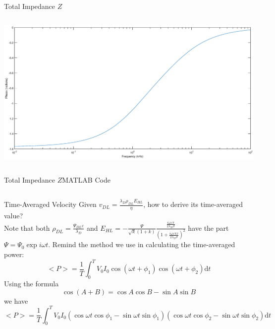 \documentclass[11pt]{beamer}
\begin{document}
\begin{frame}{Total Impedance $Z$}
\begin{columns}[onlytextwidth]
\begin{column}{0.6\textwidth}
            \includegraphics[width=\columnwidth]{4.eps}
        \end{column}
    \end{columns}
\end{frame}
\begin{frame}[fragile]{Total Impedance $Z$}{MATLAB Code}
    \inputminted[frame=single,bgcolor=bg,breaklines,breakanywhere,fontsize=\tiny]{matlab}{../Model/impedance.m}
\end{frame}
\begin{frame}{Time-Averaged Velocity}
    Given $v_{DL}=\frac{\lambda_D\rho_{DL}E_{HL}}{\eta}$, how to derive its time-averaged value?\\
    Note that both $\rho_{DL}=\frac{\Psi_{DL}\varepsilon}{\lambda_D}$ and $E_{HL}=-\frac{\Psi}{\sqrt{k}(1+k)}\frac{\frac{i\omega\varepsilon\pi}{2\lambda_D\sigma}}{(1+\frac{i\omega\varepsilon\pi x}{2\lambda_D\sigma})^2}$ have the part $\Psi=\Psi_0\exp{i\omega t}$.
    Remind the method we use in calculating the time-averaged power:\\
    \[<P>=\frac{1}{T}\int_0^T{V_0I_0\cos{(\omega t+\phi_1)}\cos{(\omega t+\phi_2)}\mathrm{d}t}\]
    Using the formula\\
    \[\cos{(A+B)=\cos{A}\cos{B}-\sin{A}\sin{B}}\]
    we have\\
    \footnotesize{\[<P>=\frac{1}{T}\int_0^T{V_0I_0(\cos{\omega t}\cos{\phi_1}-\sin{\omega t}\sin{\phi_1})(\cos{\omega t}\cos{\phi_2}-\sin{\omega t}\sin{\phi_2})\mathrm{d}t}\]}
\end{frame}
\end{document}
